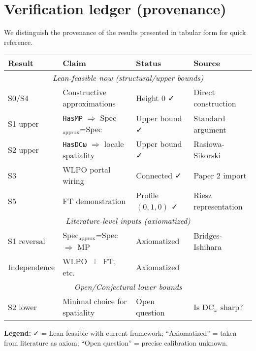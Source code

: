 \documentclass[11pt]{article}
\theoremstyle{plain}
\theoremstyle{definition}
\theoremstyle{remark}
\begin{document}
\section{Verification ledger (provenance)}\label{sec:ledger}

We distinguish the provenance of the results presented in tabular form for quick reference.

\begin{center}
\begin{tabular}{|l|p{5cm}|p{3.5cm}|p{3cm}|}
\hline
\textbf{Result} & \textbf{Claim} & \textbf{Status} & \textbf{Source} \\
\hline
\multicolumn{4}{|c|}{\textit{Lean-feasible now (structural/upper bounds)}} \\
\hline
S0/S4 & Constructive approximations & Height 0 ✓ & Direct construction \\
\hline
S1 upper & \texttt{HasMP} $\Rightarrow$ Spec$_{\text{approx}}$=Spec & Upper bound ✓ & Standard argument \\
\hline
S2 upper & \texttt{HasDCω} $\Rightarrow$ locale spatiality & Upper bound ✓ & Rasiowa-Sikorski \\
\hline
S3 & WLPO portal wiring & Connected ✓ & Paper 2 import \\
\hline
S5 & FT demonstration & Profile $(0,1,0)$ ✓ & Riesz representation \\
\hline
\multicolumn{4}{|c|}{\textit{Literature-level inputs (axiomatized)}} \\
\hline
S1 reversal & Spec$_{\text{approx}}$=Spec $\Rightarrow$ MP & Axiomatized & Bridges-Ishihara \cite{BridgesRichman} \\
\hline
Independence & WLPO $\perp$ FT, etc. & Axiomatized & \cite{Simpson, Ishihara06} \\
\hline
\multicolumn{4}{|c|}{\textit{Open/Conjectural lower bounds}} \\
\hline
S2 lower & Minimal choice for spatiality & Open question & Is DC$_\omega$ sharp? \\
\hline
\end{tabular}
\end{center}

\noindent\textbf{Legend:} ✓ = Lean-feasible with current framework; ``Axiomatized'' = taken from literature as axiom; ``Open question'' = precise calibration unknown.

\end{document}

